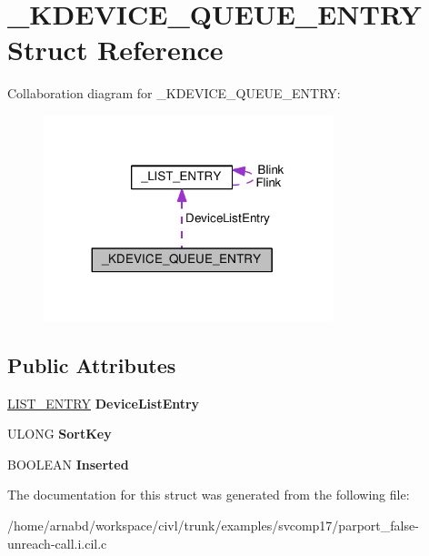 \hypertarget{struct__KDEVICE__QUEUE__ENTRY}{}\section{\+\_\+\+K\+D\+E\+V\+I\+C\+E\+\_\+\+Q\+U\+E\+U\+E\+\_\+\+E\+N\+T\+R\+Y Struct Reference}
\label{struct__KDEVICE__QUEUE__ENTRY}


Collaboration diagram for \+\_\+\+K\+D\+E\+V\+I\+C\+E\+\_\+\+Q\+U\+E\+U\+E\+\_\+\+E\+N\+T\+R\+Y\+:
\nopagebreak
\begin{figure}[H]
\begin{center}
\leavevmode
\includegraphics[width=239pt]{struct__KDEVICE__QUEUE__ENTRY__coll__graph}
\end{center}
\end{figure}
\subsection*{Public Attributes}
\begin{DoxyCompactItemize}
\item 
\hypertarget{struct__KDEVICE__QUEUE__ENTRY_a2f45451f87e93014f4b15e898ac8d06b}{}\hyperlink{struct__LIST__ENTRY}{L\+I\+S\+T\+\_\+\+E\+N\+T\+R\+Y} {\bfseries Device\+List\+Entry}\label{struct__KDEVICE__QUEUE__ENTRY_a2f45451f87e93014f4b15e898ac8d06b}

\item 
\hypertarget{struct__KDEVICE__QUEUE__ENTRY_a31d8830ee88b7e330775e07c8ca9b42e}{}U\+L\+O\+N\+G {\bfseries Sort\+Key}\label{struct__KDEVICE__QUEUE__ENTRY_a31d8830ee88b7e330775e07c8ca9b42e}

\item 
\hypertarget{struct__KDEVICE__QUEUE__ENTRY_a64da69873748fcb849192f3d78113ea3}{}B\+O\+O\+L\+E\+A\+N {\bfseries Inserted}\label{struct__KDEVICE__QUEUE__ENTRY_a64da69873748fcb849192f3d78113ea3}

\end{DoxyCompactItemize}


The documentation for this struct was generated from the following file\+:\begin{DoxyCompactItemize}
\item 
/home/arnabd/workspace/civl/trunk/examples/svcomp17/parport\+\_\+false-\/unreach-\/call.\+i.\+cil.\+c\end{DoxyCompactItemize}
